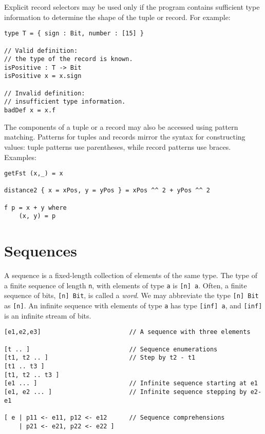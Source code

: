 Explicit record selectors may be used only if the program contains
sufficient type information to determine the shape of the tuple or
record. For example:

\begin{verbatim}
type T = { sign : Bit, number : [15] }

// Valid definition:
// the type of the record is known.
isPositive : T -> Bit
isPositive x = x.sign

// Invalid definition:
// insufficient type information.
badDef x = x.f
\end{verbatim}

The components of a tuple or a record may also be accessed using pattern
matching. Patterns for tuples and records mirror the syntax for
constructing values: tuple patterns use parentheses, while record
patterns use braces. Examples:

\begin{verbatim}
getFst (x,_) = x

distance2 { x = xPos, y = yPos } = xPos ^^ 2 + yPos ^^ 2

f p = x + y where
    (x, y) = p
\end{verbatim}

\section{Sequences}\label{sequences}

A sequence is a fixed-length collection of elements of the same type.
The type of a finite sequence of length \texttt{n}, with elements of
type \texttt{a} is \texttt{{[}n{]}\ a}. Often, a finite sequence of
bits, \texttt{{[}n{]}\ Bit}, is called a \emph{word}. We may abbreviate
the type \texttt{{[}n{]}\ Bit} as \texttt{{[}n{]}}. An infinite sequence
with elements of type \texttt{a} has type \texttt{{[}inf{]}\ a}, and
\texttt{{[}inf{]}} is an infinite stream of bits.

\begin{verbatim}
[e1,e2,e3]                        // A sequence with three elements

[t .. ]                           // Sequence enumerations
[t1, t2 .. ]                      // Step by t2 - t1
[t1 .. t3 ]
[t1, t2 .. t3 ]
[e1 ... ]                         // Infinite sequence starting at e1
[e1, e2 ... ]                     // Infinite sequence stepping by e2-e1

[ e | p11 <- e11, p12 <- e12      // Sequence comprehensions
    | p21 <- e21, p22 <- e22 ]
\end{verbatim}

